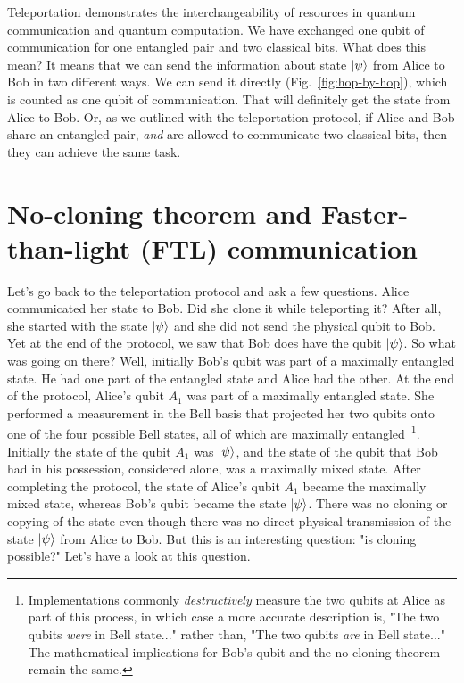 Teleportation demonstrates the interchangeability of resources in quantum communication and quantum computation. We have exchanged one qubit of communication for one entangled pair and two classical bits. What does this mean? It means that we can send the information about state $\left| \psi \right\rangle$ from Alice to Bob in two different ways. We can send it directly (Fig.~\ref{fig:hop-by-hop}), which is counted as one qubit of communication. That will definitely get the state from Alice to Bob. Or, as we outlined with the teleportation protocol, if Alice and Bob share an entangled pair, \emph{and} are allowed to communicate two classical bits, then they can achieve the same task.

\section{No-cloning theorem and Faster-than-light (FTL) communication}
\label{sec:8-3_no-cloning}

Let's go back to the teleportation protocol and ask a few questions. Alice communicated her state to Bob. Did she clone it while teleporting it? After all, she started with the state $\left| \psi \right\rangle$ and she did not send the physical qubit to Bob. Yet at the end of the protocol, we saw that Bob does have the qubit $\left| \psi \right\rangle$. So what was going on there? Well, initially Bob's qubit was part of a maximally entangled state. He had one part of the entangled state and Alice had the other. At the end of the protocol, Alice's qubit $A_1$ was part of a maximally entangled state. She performed a measurement in the Bell basis that projected her two qubits onto one of the four possible Bell states, all of which are maximally entangled~\footnote{Implementations commonly \emph{destructively} measure the two qubits at Alice as part of this process, in which case a more accurate description is, "The two qubits \emph{were} in Bell state..." rather than, "The two qubits \emph{are} in Bell state..." The mathematical implications for Bob's qubit and the no-cloning theorem remain the same.}. Initially the state of the qubit $A_1$ was $\left| \psi \right\rangle$, and the state of the qubit that Bob had in his possession, considered alone, was a maximally mixed state. After completing the protocol, the state of Alice's qubit $A_1$ became the maximally mixed state, whereas Bob's qubit became the state $\left| \psi \right\rangle$. There was no cloning or copying of the state even though there was no direct physical transmission of the state $\left| \psi \right\rangle$ from Alice to Bob. But this is an interesting question: "is cloning possible?"  Let's have a look at this question.


